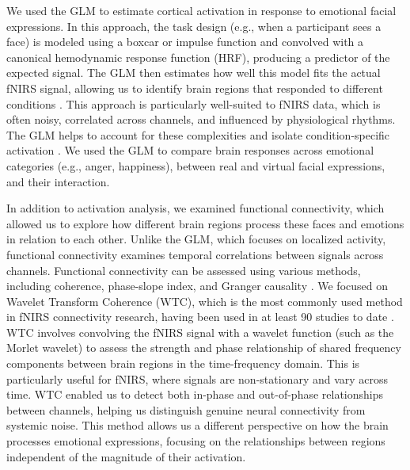 We used the GLM to estimate cortical activation in response to emotional facial expressions.
In this approach, the task design (e.g., when a participant sees a face) is modeled using a boxcar or impulse function and convolved with a canonical hemodynamic response function (HRF), producing a predictor of the expected signal.
The GLM then estimates how well this model fits the actual fNIRS signal, allowing us to identify brain regions that responded to different conditions \citep{tak_statistical_2014}.
This approach is particularly well-suited to fNIRS data, which is often noisy, correlated across channels, and influenced by physiological rhythms.
The GLM helps to account for these complexities and isolate condition-specific activation \citep{huppert_commentary_2016}.
We used the GLM to compare brain responses across emotional categories (e.g., anger, happiness), between real and virtual facial expressions, and their interaction.

In addition to activation analysis, we examined functional connectivity, which allowed us to explore how different brain regions process these faces and emotions in relation to each other.
Unlike the GLM, which focuses on localized activity, functional connectivity examines temporal correlations between signals across channels.
Functional connectivity can be assessed using various methods, including coherence, phase-slope index, and Granger causality \citep{bastos_tutorial_2016}.
We focused on Wavelet Transform Coherence (WTC), which is the most commonly used method in fNIRS connectivity research, having been used in at least 90 studies to date \citep{hakim_quantification_2023}.
WTC involves convolving the fNIRS signal with a wavelet function (such as the Morlet wavelet) to assess the strength and phase relationship of shared frequency components between brain regions in the time-frequency domain.
This is particularly useful for fNIRS, where signals are non-stationary and vary across time.
WTC enabled us to detect both in-phase and out-of-phase relationships between channels, helping us distinguish genuine neural connectivity from systemic noise.
This method allows us a different perspective on how the brain processes emotional expressions, focusing on the relationships between regions independent of the magnitude of their activation.

